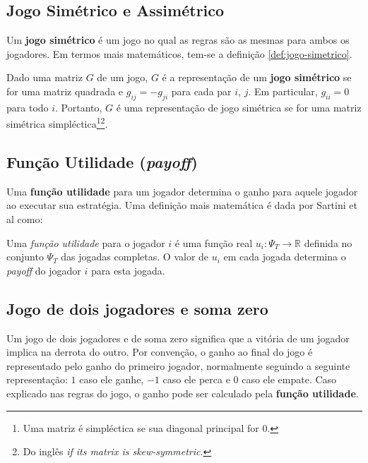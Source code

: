 \subsection{Jogo Simétrico e Assimétrico}
\label{subsec:jogo-simetrico-e-assimetrico}

Um \textbf{jogo simétrico} é um jogo no qual as regras são as mesmas para ambos os jogadores. Em termos mais matemáticos, tem-se a definição \ref{def:jogo-simetrico}.

\begin{mydef}\label{def:jogo-simetrico}
Dado uma matriz $G$ de um jogo, $G$ é a representação de um \textbf{jogo simétrico} se for uma matriz quadrada e $g_{ij} = -g_{ji}$ para cada par $i$, $j$. Em particular, $g_{ii} = 0$ para todo $i$. Portanto, $G$ é uma representação de jogo simétrica se for uma matriz simétrica simpléctica\footnote{Uma matriz é simpléctica se sua diagonal principal for 0.}\footnote{Do inglês \emph{if its matrix is skew-symmetric}.}. \cite{jones_1980}
\end{mydef}

\subsection{Função Utilidade (\emph{payoff})}
\label{subsec:funcao-utilidade}

Uma \textbf{função utilidade} para um jogador determina o ganho para aquele jogador ao executar sua estratégia. Uma definição mais matemática é dada por Sartini et al como:

\begin{mydef}\label{def:funcao-utilidade}
Uma \emph{função utilidade} para o jogador $i$ é uma função real $u_i:\Psi_T \rightarrow \mathbb{R}$ definida no conjunto $\Psi_T$ das jogadas completas. O valor de $u_i$ em cada jogada determina o \emph{payoff} do jogador $i$ para esta jogada. \cite{sartini_IIbienaldasbm}
\end{mydef}

\subsection{Jogo de dois jogadores e soma zero}
\label{subsec:jogo-de-dois-jogadores-e-soma-zero}

Um jogo de dois jogadores e de soma zero significa que a vitória de um jogador implica na derrota do outro. Por convenção, o ganho ao final do jogo é representado pelo ganho do primeiro jogador, normalmente seguindo a seguinte representação: $1$ caso ele ganhe, $-1$ caso ele perca e $0$ caso ele empate. Caso explicado nas regras do jogo, o ganho pode ser calculado pela \textbf{função utilidade}.


